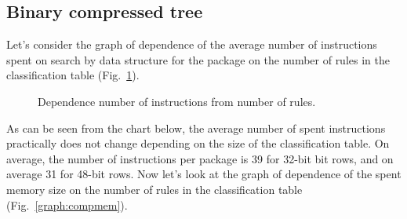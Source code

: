 \documentclass[conference]{IEEEtran}
\begin{document}
        \subsection{Binary compressed tree}
            Let's consider the graph of dependence of the average number of instructions 
            spent on search by data structure for the package on the number of rules 
            in the classification table (Fig.~\ref{graph:compinst}).
            \begin{figure}[h!]
                \centering
                \captionsetup{justification=centering}
                \caption{Dependence number of instructions from number of rules.}
                \label{graph:compinst}
            \end{figure}
            As can be seen from the chart below, the average number of spent instructions 
            practically does not change depending on the size of the classification table.
            On average, the number of instructions per package is 39 for 32-bit bit rows, 
            and on average 31 for 48-bit rows.
            Now let's look at the graph of dependence of the spent memory size on the number 
            of rules in the classification table (Fig.~\ref{graph:compmem}).
\end{document}
